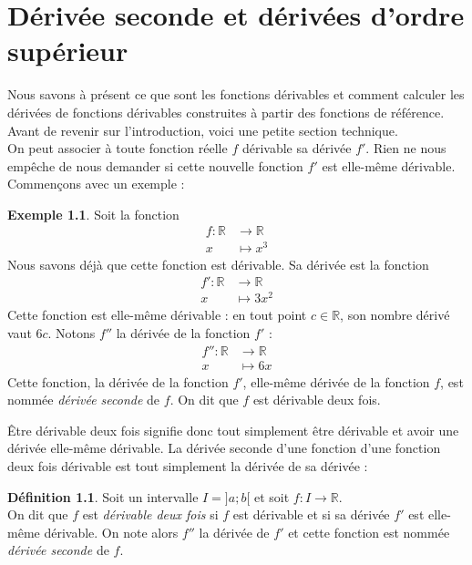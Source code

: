\documentclass[a4paper,fontsize=13pt]{scrreprt}
\theoremstyle{plain}
\theoremstyle{definition}
\newtheorem{déf}[subsection]{Définition}
\newtheorem{exe}[subsection]{Exemple}
\newcommand{\rr}{\mathbb{R}}
\begin{document}
\chapter{Dérivée seconde et dérivées d'ordre supérieur}

Nous savons à présent ce que sont les fonctions dérivables et comment calculer les dérivées de fonctions dérivables construites à partir des fonctions de référence. Avant de revenir sur l'introduction, voici une petite section technique. \\
On peut associer à toute fonction réelle $f$ dérivable sa dérivée $f'$. Rien ne nous empêche de nous demander si cette nouvelle fonction $f'$ est elle-même dérivable. Commençons avec un exemple :
\begin{exe}
Soit la fonction \begin{align*}
	f : \rr &\to \rr \\
	x &\mapsto x^3
	\end{align*}
Nous savons déjà que cette fonction est dérivable. Sa dérivée est la fonction \begin{align*}
	f' : \rr &\to \rr \\
	x &\mapsto 3x^2
	\end{align*}
Cette fonction est elle-même dérivable : en tout point $c \in \rr$, son nombre dérivé vaut $6c$. Notons $f''$ la dérivée de la fonction $f'$ :\begin{align*}
	f'' : \rr &\to \rr \\
	x &\mapsto 6x
	\end{align*}
Cette fonction, la dérivée de la fonction $f'$, elle-même dérivée de la fonction $f$, est nommée \emph{dérivée seconde} de $f$. On dit que $f$ est dérivable deux fois.
\end{exe}
Être dérivable deux fois signifie donc tout simplement être dérivable et avoir une dérivée elle-même dérivable. La dérivée seconde d'une fonction d'une fonction deux fois dérivable est tout simplement la dérivée de sa dérivée :
\begin{déf}
Soit un intervalle $I=]a;b[$ et soit $f : I \to \rr$. \\
On dit que $f$ est \emph{dérivable deux fois} si $f$ est dérivable et si sa dérivée $f'$ est elle-même dérivable. On note alors $f''$ la dérivée de $f'$ et cette fonction est nommée \emph{dérivée seconde} de $f$.
	\end{déf}
\end{document}
